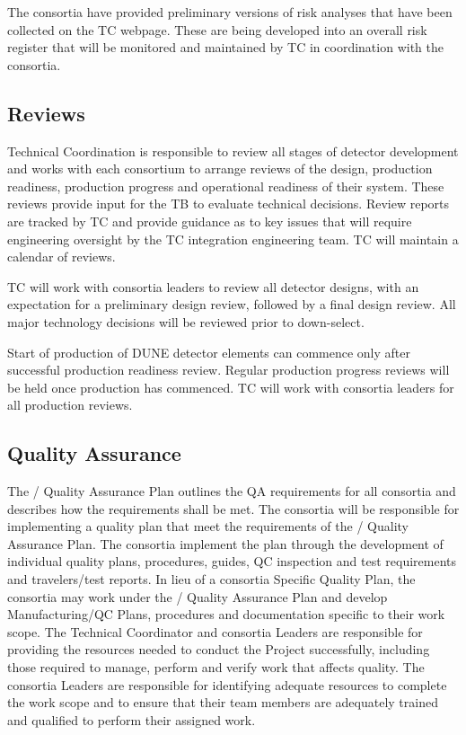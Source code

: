 The consortia have provided preliminary versions of risk analyses that
have been collected on the TC webpage. These are being developed into
an overall risk register that will be monitored and maintained by TC
in coordination with the consortia.

\subsection{Reviews}
\label{sec:fdsp-coord-reviews}

Technical Coordination is responsible to review all stages of detector
development and works with each consortium to arrange reviews of the
design, production readiness, production progress and operational
readiness of their system.  These reviews provide input for the TB to
evaluate technical decisions.  Review reports are tracked by TC and
provide guidance as to key issues that will require engineering
oversight by the TC integration engineering team. TC will maintain a
calendar of  reviews.

TC will work with consortia leaders to review all detector designs,
with an expectation for a preliminary design review, followed by a
final design review. All major technology decisions will be reviewed
prior to down-select.

Start of production of DUNE detector elements can commence only after
successful production readiness review. Regular production progress
reviews will be held once production has commenced. TC will work with
consortia leaders for all production reviews.

\subsection{Quality Assurance}
\label{sec:fdsp-coord-qa}


The / Quality Assurance Plan outlines the QA
requirements for all  consortia and describes how the
requirements shall be met. The consortia will be responsible for
implementing a quality plan that meet the requirements of the
/ Quality Assurance Plan.  The consortia
implement the plan through the development of individual quality
plans, procedures, guides, QC inspection and test requirements and
travelers/test reports.  In lieu of a consortia Specific Quality Plan,
the consortia may work under the / Quality
Assurance Plan and develop Manufacturing/QC Plans, procedures and
documentation specific to their work scope.  The 
Technical Coordinator and consortia Leaders are responsible for
providing the resources needed to conduct the Project successfully,
including those required to manage, perform and verify work that
affects quality.  The  consortia Leaders are responsible
for identifying adequate resources to complete the work scope and to
ensure that their team members are adequately trained and qualified to
perform their assigned work.

